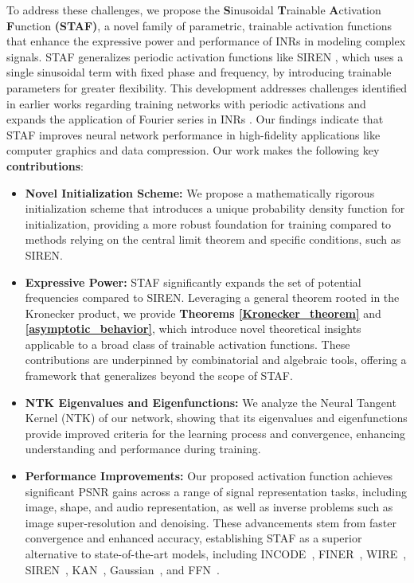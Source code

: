 To address these challenges, we propose the \textbf{S}inusoidal \textbf{T}rainable \textbf{A}ctivation \textbf{F}unction \textbf{(STAF)}, a novel family of parametric, trainable activation functions that enhance the expressive power and performance of INRs in modeling complex signals. STAF generalizes periodic activation functions like SIREN \citep{Siren}, which uses a single sinusoidal term with fixed phase and frequency, by introducing trainable parameters for greater flexibility. This development addresses challenges identified in earlier works regarding training networks with periodic activations \citep{lapedes1987nonlinear, parascandolo2016taming, mehta2021modulated} and expands the application of Fourier series in INRs \citep{gallant1988there, tancik2020fourier, shivappriya2021cascade, liao2020trainable}. Our findings indicate that STAF improves neural network performance in high-fidelity applications like computer graphics and data compression. Our work makes the following key \textbf{contributions}:
\begin{itemize}[label=$\bullet$, leftmargin=*]
    \item \textbf{Novel Initialization Scheme:} We propose a mathematically rigorous initialization scheme that introduces a unique probability density function for initialization, providing a more robust foundation for training compared to methods relying on the central limit theorem and specific conditions, such as SIREN.

    \item \textbf{Expressive Power:} STAF significantly expands the set of potential frequencies compared to SIREN. Leveraging a general theorem rooted in the Kronecker product, we provide \textbf{Theorems \ref{Kronecker_theorem}} and \textbf{\ref{asymptotic_behavior}}, which introduce novel theoretical insights applicable to a broad class of trainable activation functions. These contributions are underpinned by combinatorial and algebraic tools, offering a framework that generalizes beyond the scope of STAF. 

    \item \textbf{NTK Eigenvalues and Eigenfunctions:} We analyze the Neural Tangent Kernel (NTK) of our network, showing that its eigenvalues and eigenfunctions provide improved criteria for the learning process and convergence, enhancing understanding and performance during training.

    \item \textbf{Performance Improvements:} Our proposed activation function achieves significant PSNR gains across a range of signal representation tasks, including image, shape, and audio representation, as well as inverse problems such as image super-resolution and denoising. These advancements stem from faster convergence and enhanced accuracy, establishing STAF as a superior alternative to state-of-the-art models, including INCODE~\citep{kazerouni2024incode}, FINER~\citep{liu2024finer}, WIRE~\citep{saragadam2023wire}, SIREN~\citep{Siren}, KAN~\citep{liu2024kan}, Gaussian~\citep{ramasinghe2022beyond}, and FFN~\citep{tancik2020fourier}.
\end{itemize}





